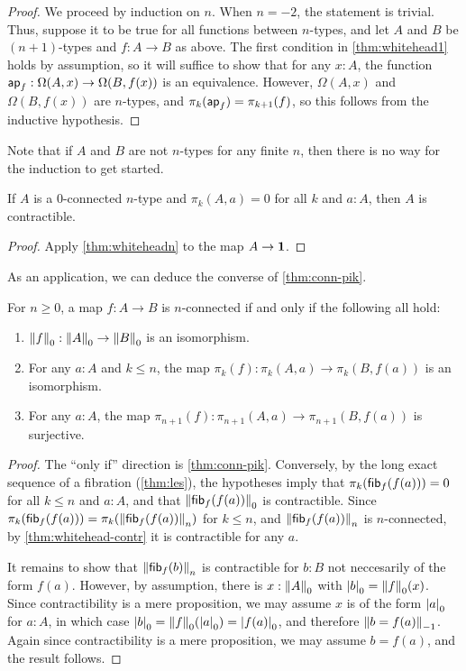 \begin{proof}
  We proceed by induction on $n$.
  When $n=-2$, the statement is trivial.
  Thus, suppose it to be true for all functions between $n$-types, and let $A$ and $B$ be $(n+1)$-types and $f:A\to B$ as above.
  The first condition in \autoref{thm:whitehead1} holds by assumption, so it will suffice to show that for any $x:A$, the function $\apfunc f: \Omega(A,x) \to \Omega(B,f(x))$ is an equivalence.
  However, $\Omega(A,x)$ and $\Omega(B,f(x))$ are $n$-types, and $\pi_k(\apfunc f) = \pi_{k+1}(f)$, so this follows from the inductive hypothesis.
\end{proof}

Note that if $A$ and $B$ are not $n$-types for any finite $n$, then there is no way for the induction to get started.

\begin{cor}\label{thm:whitehead-contr}
  If $A$ is a $0$-connected $n$-type and $\pi_k(A,a)=0$ for all $k$ and $a:A$, then $A$ is contractible.
\end{cor}
\begin{proof}
  Apply \autoref{thm:whiteheadn} to the map $A\to\unit$.
\end{proof}

As an application, we can deduce the converse of \autoref{thm:conn-pik}.

\begin{cor}\label{thm:pik-conn}
  For $n\ge 0$, a map $f:A\to B$ is $n$-connected if and only if the following all hold:
  \begin{enumerate}
  \item $\trunc0f:\trunc0A \to \trunc0B$ is an isomorphism.
  \item For any $a:A$ and $k\le n$, the map $\pi_k(f):\pi_k(A,a) \to \pi_k(B,f(a))$ is an isomorphism.
  \item For any $a:A$, the map $\pi_{n+1}(f):\pi_{n+1}(A,a) \to \pi_{n+1}(B,f(a))$ is surjective.
  \end{enumerate}
\end{cor}
\begin{proof}
  The ``only if'' direction is \autoref{thm:conn-pik}.
  Conversely, by the long exact sequence of a fibration (\autoref{thm:les}), the hypotheses imply that $\pi_k(\hfib f {f(a)})=0$ for all $k\le n$ and $a:A$, and that $\trunc 0{\hfib f{f(a)}}$ is contractible.
  Since $\pi_k(\hfib f {f(a)}) = \pi_k(\trunc n{\hfib f{f(a)}})$ for $k\le n$, and $\trunc n{\hfib f{f(a)}}$ is $n$-connected, by \autoref{thm:whitehead-contr} it is contractible for any $a$.

  It remains to show that $\trunc n{\hfib f{b}}$ is contractible for $b:B$ not neccesarily of the form $f(a)$.
  However, by assumption, there is $x:\trunc0A$ with $\tproj 0b = \trunc0f(x)$.
  Since contractibility is a mere proposition, we may assume $x$ is of the form $\tproj0a$ for $a:A$, in which case $\tproj 0 b = \trunc0f(\tproj0a) = \tproj0{f(a)}$, and therefore $\trunc{-1}{b=f(a)}$.
  Again since contractibility is a mere proposition, we may assume $b=f(a)$, and the result follows.
\end{proof}


